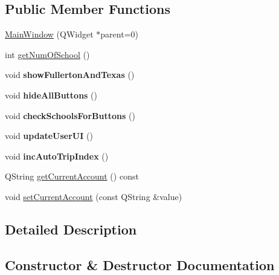 \subsection*{Public Member Functions}
\begin{DoxyCompactItemize}
\item 
\hyperlink{class_main_window_a8b244be8b7b7db1b08de2a2acb9409db}{Main\+Window} (Q\+Widget $\ast$parent=0)
\item 
int \hyperlink{class_main_window_a7eb46310d227cc49d08fc2b5874eb308}{get\+Num\+Of\+School} ()
\item 
\mbox{\label{class_main_window_a7308dbb2bccc791a28d4d49a5da7896b}} 
void {\bfseries show\+Fullerton\+And\+Texas} ()
\item 
\mbox{\label{class_main_window_a47a15cc61d9a45226d6a99965aa30602}} 
void {\bfseries hide\+All\+Buttons} ()
\item 
\mbox{\label{class_main_window_a8af1fcedce031915c7a5d55dddda225c}} 
void {\bfseries check\+Schools\+For\+Buttons} ()
\item 
\mbox{\label{class_main_window_a638d743f73a7df3da84a0235734c828d}} 
void {\bfseries update\+User\+UI} ()
\item 
\mbox{\label{class_main_window_a1f7e9a0f8c3b9530e695181b7e2b720f}} 
void {\bfseries inc\+Auto\+Trip\+Index} ()
\item 
Q\+String \hyperlink{class_main_window_afe94673b54307c640ed99688ede216df}{get\+Current\+Account} () const
\item 
void \hyperlink{class_main_window_ab57c61a8a7c714901be44d6733f86396}{set\+Current\+Account} (const Q\+String \&value)
\end{DoxyCompactItemize}


\subsection{Detailed Description}

\begin{DoxyItemize}
\item 
\end{DoxyItemize}

\subsection{Constructor \& Destructor Documentation}
\mbox{\label{class_main_window_a8b244be8b7b7db1b08de2a2acb9409db}} 
